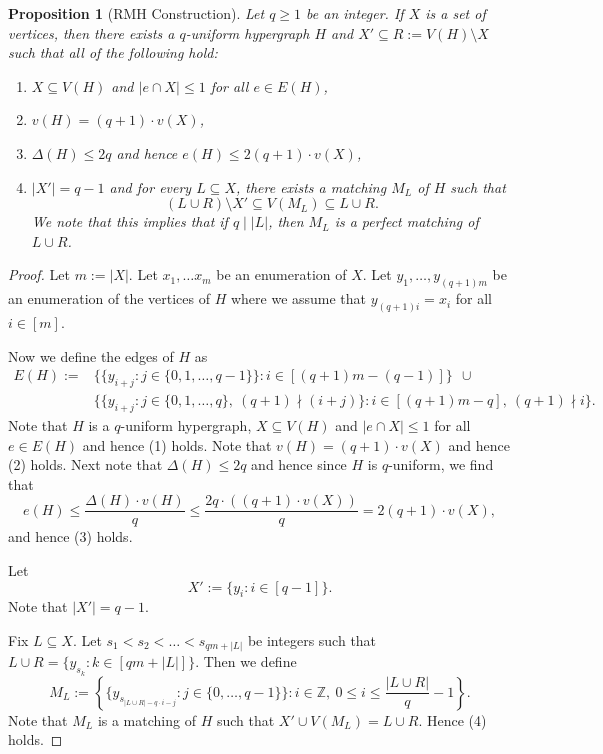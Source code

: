 \documentclass[11pt]{article}
\newcounter{i}
\theoremstyle{plain}
\newtheorem{proposition}[thm]{Proposition}
\theoremstyle{plain} %
\theoremstyle{definition}
\begin{document}
\begin{proposition}[RMH Construction]\label{prop:RMHG}
Let $q\ge 1$ be an integer. If $X$ is a set of vertices, then there exists a $q$-uniform hypergraph $H$ and $X'\subseteq R:=V(H)\setminus X$ such that all of the following hold:
\begin{enumerate}
    \item[(1)] $X\subseteq V(H)$ and $|e\cap X|\le 1$ for all $e\in E(H)$,
    \item[(2)] $v(H)=(q+1)\cdot v(X)$,
    \item[(3)] $\Delta(H)\le 2q$ and hence $e(H)\le 2(q+1)\cdot v(X)$,
    \item[(4)] $|X'|=q-1$ and for every $L\subseteq X$, there exists a matching $M_L$ of $H$ such that $$(L\cup R)\setminus X'\subseteq V(M_L)\subseteq L\cup R.$$
We note that this implies that if $q\mid|L|$, then $M_L$ is a perfect matching of $L\cup R$.
\end{enumerate}
\end{proposition}
\begin{proof}
Let $m:= |X|$. Let $x_1,\ldots x_m$ be an enumeration of $X$. Let $y_1,\ldots, y_{(q+1)m}$ be an enumeration of the vertices of $H$ where we assume that $y_{(q+1)i}=x_i$ for all $i\in [m]$.

Now we define the edges of $H$ as
\begin{align*}
E(H):= &\Big\{ \big\{y_{i+j}:j\in \{0,1,\ldots, q-1\}\big\}: i\in [(q+1)m- (q-1)]\Big\}~~\cup\\
&\Big\{ \big\{y_{i+j}:j\in \{0,1,\ldots, q\},~(q+1)\nmid (i+j)\big\}: i\in [(q+1)m-q],~(q+1)\nmid i\Big\}.    
\end{align*}
Note that $H$ is a $q$-uniform hypergraph, $X\subseteq V(H)$ and $|e\cap X|\le 1$ for all $e\in E(H)$ and hence (1) holds. Note that $v(H)=(q+1)\cdot v(X)$ and hence (2) holds. Next note that $\Delta(H)\le 2q$ and hence since $H$ is $q$-uniform, we find that 
$$e(H) \le \frac{\Delta(H)\cdot v(H)}{q} \le \frac{2q\cdot ((q+1)\cdot v(X))}{q} = 2(q+1)\cdot v(X),$$ 
and hence (3) holds.

Let $$X':= \{y_{i}: i\in [q-1]\}.$$ 
Note that $|X'|=q-1$.

Fix $L\subseteq X$. Let   $s_1 < s_2 <\ldots < s_{qm+|L|}$ be integers such that $L\cup R=\{ y_{s_k}:k\in [qm+|L|]\}$. Then we define
$$M_L := \left\{ \big\{ y_{s_{|L\cup R|-q\cdot i-j}}: j\in \{0,\ldots, q-1\} \big\}: i\in \mathbb{Z},~0\le i \le \frac{|L\cup R|}{q} -1 \right\}.$$
Note that $M_L$ is a matching of $H$ such that $X'\cup V(M_L) = L\cup R$. Hence (4) holds.
\end{proof}
\end{document}
